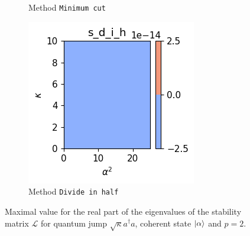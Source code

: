 \begin{figure}[h!]
\begin{subfigure}{0.32\linewidth}
        \caption{Method \texttt{Minimum cut}}
        \label{fig:H_0_and_losses_deph_p_2_rule_min-cut}
    \end{subfigure}
    \hfill
    \begin{subfigure}{0.32\linewidth}
        \centering
        \includegraphics[width=\linewidth]{Pics/H_0_and_losses_deph_p_2_rule_smart_divide_in_half.pdf}
        \caption{Method \texttt{Divide in half}}
        \label{fig:H_0_and_losses_deph_p_2_rule_smart_divide_in_half}
    \end{subfigure}
    \caption{Maximal value for the real part of the eigenvalues of the stability matrix $\mathcal{L}$ for quantum jump $\sqrt{\kappa} a^\dagger a$, coherent state $\ket{\alpha}$ and $p=2$.}
    \label{fig:CompStabDeph}
\end{figure}


